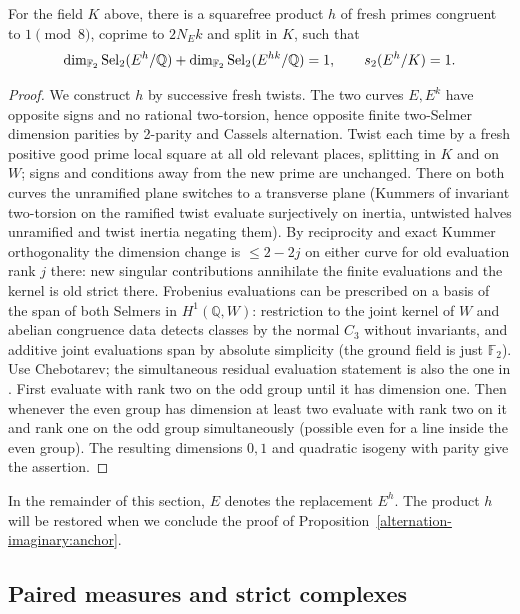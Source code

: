 \begin{lemma}\label{alternation-imaginary:selmer-seed}
For the field \(K\) above, there is a squarefree product \(h\) of fresh primes congruent to \(1\pmod8\), coprime to \(2N_Ek\) and split in \(K\), such that
\[
 \dim_{\mathbb F_2}\operatorname{Sel}_2(E^h/\mathbb Q)
 +\dim_{\mathbb F_2}\operatorname{Sel}_2(E^{hk}/\mathbb Q)=1,
 \qquad s_2(E^h/K)=1.
\]
\end{lemma}
\begin{proof}
We construct \(h\) by successive fresh twists. The two curves \(E,E^k\) have opposite signs and no rational two-torsion, hence opposite finite two-Selmer dimension parities by 2-parity and Cassels alternation. Twist each time by a fresh positive good prime local square at all old relevant places, splitting in \(K\) and on \(W\); signs and conditions away from the new prime are unchanged. There on both curves the unramified plane switches to a transverse plane (Kummers of invariant two-torsion on the ramified twist evaluate surjectively on inertia, untwisted halves unramified and twist inertia negating them). By reciprocity and exact Kummer orthogonality the dimension change is \(\le 2-2j\) on either curve for old evaluation rank \(j\) there: new singular contributions annihilate the finite evaluations and the kernel is old strict there. Frobenius evaluations can be prescribed on a basis of the span of both Selmers in \(H^1(\mathbb Q,W)\): restriction to the joint kernel of \(W\) and abelian congruence data detects classes by the normal \(C_3\) without invariants, and additive joint evaluations span by absolute simplicity (the ground field is just \(\mathbb F_2\)). Use Chebotarev; the simultaneous residual evaluation statement is also the one in \cite[Lemma~3.5]{MazurRubin10}. First evaluate with rank two on the odd group until it has dimension one. Then whenever the even group has dimension at least two evaluate with rank two on it and rank one on the odd group simultaneously (possible even for a line inside the even group). The resulting dimensions \(0,1\) and quadratic isogeny with parity give the assertion.
\end{proof}

In the remainder of this section, \(E\) denotes the replacement \(E^h\). The product \(h\) will be restored when we conclude the proof of Proposition~\ref{alternation-imaginary:anchor}.

\subsection{Paired measures and strict complexes}

